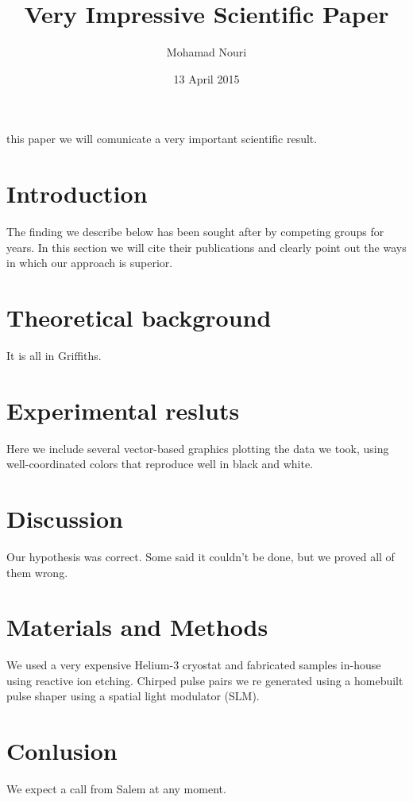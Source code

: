 \documentclass[11pt]{amsart}
\title{Very Impressive Scientific Paper}
\author{Mohamad Nouri}
\date{13 April 2015}
\begin{document}
\In this paper we will comunicate a very important scientific result.

\section{Introduction}

The finding we describe below has been sought after by competing groups
 for years. In this section we will cite their publications and clearly 
point out the ways in which our approach is superior.

\section{Theoretical background}

It is all in Griffiths.

\section{Experimental resluts}

Here we include several vector-based graphics plotting the data we
 took, using well-coordinated colors that reproduce well in black and 
white.

\section{Discussion}

Our hypothesis was correct. Some said it couldn't be done, but we
proved all of them wrong.

\section{Materials and Methods}

We used a very expensive Helium-3 cryostat and fabricated samples 
in-house using reactive ion etching. Chirped pulse pairs we re
generated using a homebuilt pulse shaper using a spatial light
 modulator (SLM).

\section{Conlusion} 

We expect a call from Salem at any moment.
\end{document}
